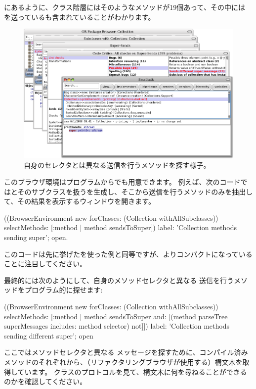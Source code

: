 \documentclass[a4paper,10pt,twoside]{book}
\begin{document}
にあるように、クラス階層にはそのようなメソッドが19個あって、その中には を送っているも含まれていることがわかります。
\begin{figure}[ht]\centering
	\includegraphics[width=\linewidth]{sendDifferentSuper}
	\caption{自身のセレクタとは異なる\super 送信を行うメソッドを探す様子。}
\end{figure}

このブラウザ環境はプログラムからでも用意できます。
例えば、次のコードではとそのサブクラスを扱うを生成し、そこから\super 送信を行うメソッドのみを抽出して、その結果を表示するウィンドウを開きます。
\begin{code}{}
((BrowserEnvironment new forClasses: (Collection withAllSubclasses))
	selectMethods: [:method | method sendsToSuper])
	label: 'Collection methods sending super';
	open.
\end{code}{}

このコードは先に挙げたを使った例と同等ですが、よりコンパクトになっていることに注目してください。

最終的には次のようにして、自身のメソッドセレクタと異なる \super 送信を行うメソッドをプログラム的に探せます:
\begin{code}{}
((BrowserEnvironment new forClasses: (Collection withAllSubclasses))
	selectMethods: [:method | 
		method sendsToSuper
		and: [(method parseTree superMessages includes: method selector) not]])
	label: 'Collection methods sending different super';
	open
\end{code}
ここではメソッドセレクタと異なる \super メッセージを探すために、コンパイル済みメソッドのそれぞれから、（リファクタリングブラウザが使用する）構文木を取得しています。
クラスのプロトコルを見て、構文木に何を尋ねることができるのかを確認してください。
\end{document}
